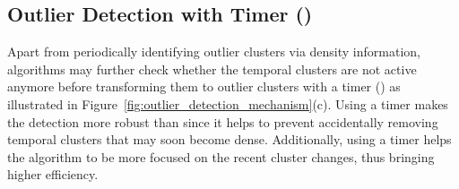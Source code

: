 
\subcompact
\subsection{Outlier Detection with Timer (\timer)}
\label{subsec:timer}
Apart from periodically identifying outlier clusters via density information, \dsc algorithms may further check whether the temporal clusters are not active anymore before transforming them to outlier clusters with a timer (\timer) as illustrated in Figure~\ref{fig:outlier_detection_mechanism}(c). 
Using a timer makes the detection more robust than \od since it helps to prevent accidentally removing temporal clusters that may soon become dense.
Additionally, using a timer helps the \dsc algorithm to be more focused on the recent cluster changes, thus bringing higher efficiency.


\subcompact
